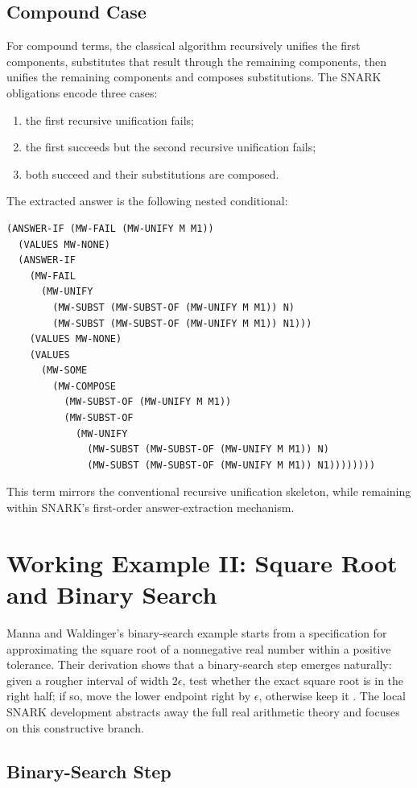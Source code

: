 \documentclass[runningheads]{llncs}
\begin{document}
\subsection{Compound Case}

For compound terms, the classical algorithm recursively unifies the first
components, substitutes that result through the remaining components, then
unifies the remaining components and composes substitutions.  The SNARK
obligations encode three cases:
\begin{enumerate}
\item the first recursive unification fails;
\item the first succeeds but the second recursive unification fails;
\item both succeed and their substitutions are composed.
\end{enumerate}
The extracted answer is the following nested conditional:
\begin{lstlisting}
(ANSWER-IF (MW-FAIL (MW-UNIFY M M1))
  (VALUES MW-NONE)
  (ANSWER-IF
    (MW-FAIL
      (MW-UNIFY
        (MW-SUBST (MW-SUBST-OF (MW-UNIFY M M1)) N)
        (MW-SUBST (MW-SUBST-OF (MW-UNIFY M M1)) N1)))
    (VALUES MW-NONE)
    (VALUES
      (MW-SOME
        (MW-COMPOSE
          (MW-SUBST-OF (MW-UNIFY M M1))
          (MW-SUBST-OF
            (MW-UNIFY
              (MW-SUBST (MW-SUBST-OF (MW-UNIFY M M1)) N)
              (MW-SUBST (MW-SUBST-OF (MW-UNIFY M M1)) N1))))))))
\end{lstlisting}
This term mirrors the conventional recursive unification skeleton, while
remaining within SNARK's first-order answer-extraction mechanism.

\section{Working Example II: Square Root and Binary Search}

Manna and Waldinger's binary-search example starts from a specification for
approximating the square root of a nonnegative real number within a positive
tolerance.  Their derivation shows that a binary-search step emerges naturally:
given a rougher interval of width \(2\epsilon\), test whether the exact square
root is in the right half; if so, move the lower endpoint right by
\(\epsilon\), otherwise keep it \cite{MannaWaldinger1985IJCAI,MannaWaldinger1987}.
The local SNARK development abstracts away the full real
arithmetic theory and focuses on this constructive branch.

\subsection{Binary-Search Step}
\end{document}

